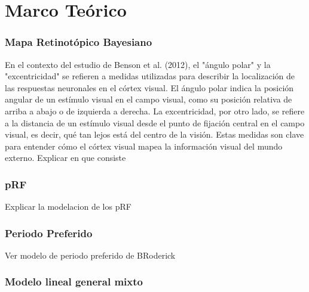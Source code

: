 \chapter{Marco Te\'orico}\label{chapter:theory}

\subsection*{Mapa Retinot\'opico Bayesiano}
En el contexto del estudio de Benson et al. (2012), el "ángulo polar" y la "excentricidad" se refieren a medidas utilizadas para describir la localización de las respuestas neuronales en el córtex visual. El ángulo polar indica la posición angular de un estímulo visual en el campo visual, como su posición relativa de arriba a abajo o de izquierda a derecha. La excentricidad, por otro lado, se refiere a la distancia de un estímulo visual desde el punto de fijación central en el campo visual, es decir, qué tan lejos está del centro de la visión. Estas medidas son clave para entender cómo el córtex visual mapea la información visual del mundo externo.
Explicar en que consiste
\subsection*{pRF}
Explicar la modelacion de los pRF
\subsection*{Periodo Preferido}
Ver modelo de periodo preferido de BRoderick
\subsection*{Modelo lineal general mixto}